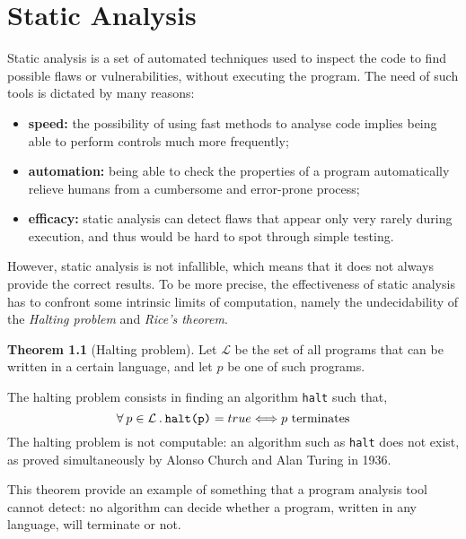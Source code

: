 \documentclass[12pt,a4paper]{book}
\newcommand{\st}{\hspace{2px}.\hspace{2px}}
\theoremstyle{definition}
\begin{document}
	\chapter{Static Analysis}
	Static analysis is a set of automated techniques used to inspect the code to find possible flaws or vulnerabilities, without executing the program. The need of such tools is dictated by many reasons:
	\begin{itemize}
		\item \textbf{speed:} the possibility of using fast methods to analyse code implies being able to perform controls much more frequently; 
		\item \textbf{automation:} being able to check the properties of a program automatically relieve humans from a cumbersome and error-prone process;
		\item \textbf{efficacy:} static analysis can detect flaws that appear only very rarely during execution, and thus would be hard to spot through simple testing.
	\end{itemize}
	However, static analysis is not infallible, which means that it does not always provide the correct results. To be more precise, the effectiveness of static analysis has to confront some intrinsic limits of computation, namely the undecidability of the \textit{Halting problem} and \textit{Rice's theorem}. 
	\theoremstyle{theorem}
	\newtheorem{thm}{Theorem}
	\begin{thm}[Halting problem] Let $\mathcal{L}$ be the set of all programs that can be written in a certain language, and let $p$ be one of such programs. 
	
	The halting problem consists in finding an algorithm \texttt{halt} such that,  
	\[
		\forall\hspace{2px}p\in\mathcal{L}\st\texttt{halt(p)} = true \Longleftrightarrow p\text{ terminates}
	\]
	The halting problem is not computable: an algorithm such as \texttt{halt} does not exist, as proved simultaneously by Alonso Church \cite{Church1936} and Alan Turing \cite{Turing1937} in 1936.
	\end{thm}
	This theorem provide an example of something that a program analysis tool cannot detect: no algorithm can decide whether a program, written in any language, will terminate or not.
	
\end{document}
